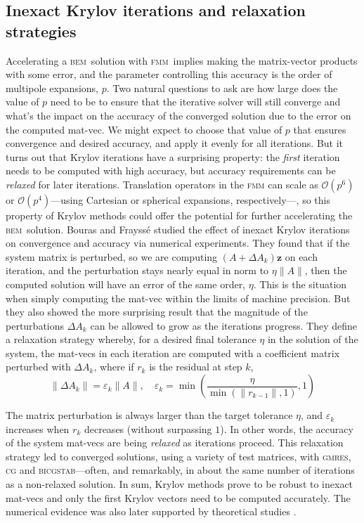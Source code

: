 \documentclass[final,leqno,]{siamltex1213}
\newcommand{\bem}{\textsc{bem}\xspace}
\newcommand{\fmm}{\textsc{fmm}\xspace}
\renewcommand{\O}[1]{\mathcal{O}(#1)}
\newcommand{\gmres}{\textsc{gmres}\xspace}
\newcommand{\vect}[1]{\mathbf{#1}}
\begin{document}
\subsection{Inexact Krylov iterations and relaxation strategies}

Accelerating a \bem\ solution with \fmm\ implies making the matrix-vector products with some error, and the parameter controlling this accuracy is the order of multipole expansions, $p$. 
Two natural questions to ask are how large does the value of $p$ need to be to ensure that the iterative solver will still converge and what's the impact on the accuracy of the converged solution due to the error on the computed mat-vec.
We might expect to choose that value of $p$ that ensures convergence and desired accuracy, and apply it evenly for all iterations. 
But it turns out that Krylov iterations have a surprising property: the \emph{first} iteration needs to be computed with high accuracy, but accuracy requirements can be \emph{relaxed} for later iterations. 
Translation operators in the \fmm can scale as $\O{p^{6}}$ or $\O{p^{4}}$---using Cartesian or spherical expansions, respectively---, so this property of Krylov methods could offer the potential for further accelerating the \bem\ solution.
Bouras and Frayss{\'e} \cite{bouras2000relaxation,bourasfraysse2005} studied the effect of inexact Krylov iterations on convergence and accuracy via numerical experiments.
They found that if the system matrix is perturbed, so we are computing $(A+\Delta A_k)\vect{z}$ on each iteration, and the perturbation stays nearly equal in norm to $\eta \|A\|$, then the computed solution will have an error of the same order, $\eta$. This is the situation when simply computing the mat-vec within the limits of machine precision. But they also showed the more surprising result that the magnitude of the perturbations $\Delta A_k$ can be allowed to grow as the iterations progress.
They define a relaxation strategy whereby, for a desired final tolerance $\eta$ in the solution of the system, the mat-vecs in each iteration are computed with a coefficient matrix perturbed with $\Delta A_k$, where if $r_k$ is the residual at step $k$,
%
\begin{equation}\label{eqn:matrix-perturbation}
  \|\Delta A_k\| = \varepsilon_k\|A\|, \quad \varepsilon_k=\min\left( \frac{\eta}{\min(\|r_{k-1}\|,1)}, 1\right) 
\end{equation}

\noindent The matrix perturbation is always larger than the target tolerance $\eta$, and $\varepsilon_k$ increases when $r_k$ decreases (without surpassing $1$). In other words, the accuracy of the system mat-vecs are being \emph{relaxed} as iterations proceed. This relaxation strategy led to converged solutions, using a variety of test matrices, with \gmres, \textsc{cg} and \textsc{bicgstab}---often, and remarkably, in about the same number of iterations as a non-relaxed solution. In sum, Krylov methods prove to be robust to inexact mat-vecs and only the first Krylov vectors need to be computed accurately.
The numerical evidence was also later supported by theoretical studies \cite{simonciniszyld2003,vandeneshofsleijpen2004}.
\end{document}
